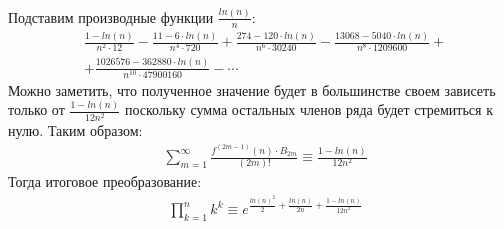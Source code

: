 \documentclass[a4paper,12pt,numbers=noenddot]{scrreprt}
\begin{document}
\begin{flushleft}
\begin{align}
    \end{align}
    Подставим производные функции $\frac{ln(n)}{n}$:
    \begin{align}
    & \frac{1-ln(n)}{n^2 \cdot 12} - \frac{11-6 \cdot ln(n)}{n^4 \cdot 720} + \frac{274-120 \cdot ln(n)}{n^6 \cdot 30240} - \frac{13068-5040 \cdot ln(n)}{n^8 \cdot 1209600} + \\&
    + \frac{1026576-362880 \cdot ln(n)}{n^{10} \cdot 47900160} - \cdots
    \end{align}
    Можно заметить, что полученное значение будет в большинстве своем зависеть только от $\frac{1-ln(n)}{12n^2}$ поскольку сумма остальных членов ряда будет стремиться к нулю. Таким образом: 
    \begin{align}
    & \sum_{m=1}^\infty \frac{f^{(2m-1)}(n) \cdot B_{2m}}{(2m)!} \equiv \frac{1-ln(n)}{12n^2}
    \end{align}
    Тогда итоговое преобразование:
    \begin{align}   
    & \prod_{k=1}^{n} k^k \equiv e^{\frac{ln(n)^2}{2}+\frac{ln(n)}{2n} +\frac{1-ln(n)}{12n^2}}
    \end{align}
\end{flushleft}
\end{document}
